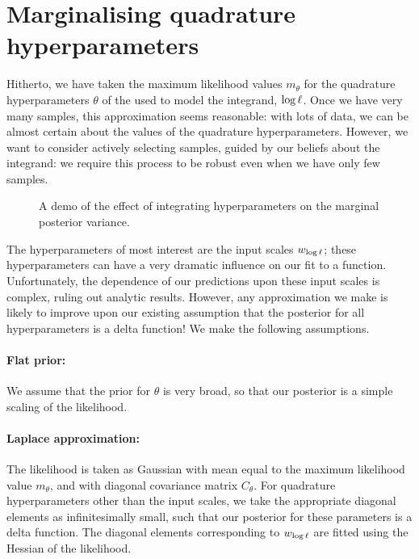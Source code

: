 \documentclass{article}
\begin{document}
\section{Marginalising quadrature hyperparameters}
\label{sec:marginalization}
Hitherto, we have taken the maximum likelihood values $m_\theta$ for the quadrature hyperparameters $\theta$ of the \gpb used to model the integrand, $\tr$. Once we have very many samples, this approximation seems reasonable: with lots of data, we can be almost certain about the values of the quadrature hyperparameters. However, we want to consider actively selecting samples, guided by our beliefs about the integrand: we require this process to be robust even when we have only few samples. 


\begin{figure}
\centering
{}
\caption{A demo of the effect of integrating hyperparameters on the marginal posterior variance.}
\label{fig:integrate_hypers}
\end{figure}

The hyperparameters of most interest are the input scales $w_\tr$; these hyperparameters can have a very dramatic influence on our fit to a function. Unfortunately, the dependence of our predictions upon these input scales is complex, ruling out analytic results. However, any approximation we make is likely to improve upon our existing assumption that the posterior for all hyperparameters is a delta function! We make the following assumptions.

 \paragraph*{Flat prior:} We assume that the prior for $\theta$ is very broad, so that our posterior is a simple scaling of the likelihood. 
\paragraph*{Laplace approximation:} The likelihood  is taken as Gaussian with mean equal to the maximum likelihood value $m_\theta$, and with diagonal covariance matrix $C_\theta$. For quadrature hyperparameters other than the input scales, we take the appropriate diagonal elements as infinitesimally small, such that our posterior for these parameters is a delta function. The diagonal elements corresponding to $w_\tr$ are fitted using the Hessian of the likelihood.
\end{document}
